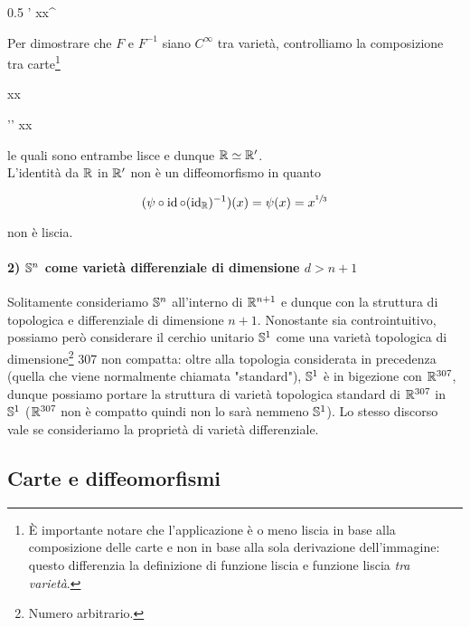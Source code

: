 	{0.5}{%
				{\R'}{\R}
				{x}{x^{}}
			}

Per dimostrare che $ F $ e $ F^{-1} $ siano $ C^{\infty} $ tra varietà, controlliamo la composizione tra carte\footnote{%
	È importante notare che l'applicazione è o meno liscia in base alla composizione delle carte e non in base alla sola derivazione dell'immagine: questo differenzia la definizione di funzione liscia e funzione liscia \textit{tra varietà}.%
}

	{\R}{\R}
	{x}{x}
	
	{\R'}{\R'}
	{x}{x}

le quali sono entrambe lisce e dunque $ \R \simeq \R' $.\\
L'identità da $ \R $ in $ \R' $ non è un diffeomorfismo in quanto

\begin{equation}
	(\psi \circ \id \circ (\id_{\R})^{-1})(x) = \psi(x) = x^{\sfrac{1}{3}}
\end{equation}

non è liscia.

\paragraph{2) $ \S^{n} $ come varietà differenziale di dimensione $ d > n+1 $}

Solitamente consideriamo $ \S^{n} $ all'interno di $ \R^{n+1} $ e dunque con la struttura di topologica e differenziale di dimensione $ n+1 $. Nonostante sia controintuitivo, possiamo però considerare il cerchio unitario $ \S^{1} $ come una varietà topologica di dimensione\footnote{%
	Numero arbitrario.%
} 307 non compatta: oltre alla topologia considerata in precedenza (quella che viene normalmente chiamata "standard"), $ \S^{1} $ è in bigezione con $ \R^{307} $, dunque possiamo portare la struttura di varietà topologica standard di $ \R^{307} $ in $ \S^{1} $ ($ \R^{307} $ non è compatto quindi non lo sarà nemmeno $ \S^{1} $). Lo stesso discorso vale se consideriamo la proprietà di varietà differenziale.

\subsection{Carte e diffeomorfismi}

